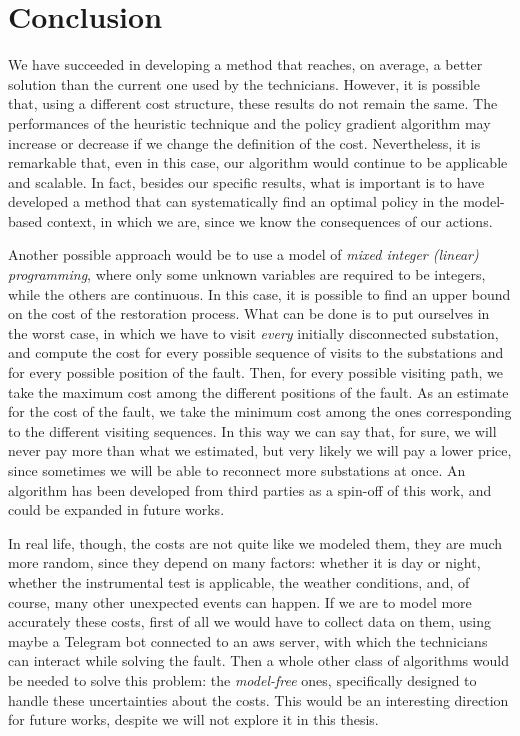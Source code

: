 \chapter{Conclusion}


We have succeeded in developing a method that reaches, on average, a better solution than the current one used by the technicians. However, it is possible that, using a different cost structure, these results do not remain the same. The performances of the heuristic technique and the policy gradient algorithm may increase or decrease if we change the definition of the cost. Nevertheless, it is remarkable that, even in this case, our algorithm would continue to be applicable and scalable. In fact, besides our specific results, what is important is to have developed a method that can systematically find an optimal policy in the model-based context, in which we are, since we know the consequences of our actions.

Another possible approach would be to use a model of \emph{mixed integer (linear) programming}, where only some unknown variables are required to be integers, while the others are continuous. In this case, it is possible to find an upper bound on the cost of the restoration process. What can be done is to put ourselves in the worst case, in which we have to visit \emph{every} initially disconnected substation, and compute the cost for every possible sequence of visits to the substations and for every possible position of the fault. Then, for every possible visiting path, we take the maximum cost among the different positions of the fault. As an estimate for the cost of the fault, we take the minimum cost among the ones corresponding to the different visiting sequences. In this way we can say that, for sure, we will never pay more than what we estimated, but very likely we will pay a lower price, since sometimes we will be able to reconnect more substations at once. An algorithm has been developed from third parties as a spin-off of this work, and could be expanded in future works.

In real life, though, the costs are not quite like we modeled them, they are much more random, since they depend on many factors: whether it is day or night, whether the instrumental test is applicable, the weather conditions, and, of course, many other unexpected events can happen. If we are to model more accurately these costs, first of all we would have to collect data on them, using maybe a Telegram bot connected to an \acrshort{aws} server, with which the technicians can interact while solving the fault. Then a whole other class of algorithms would be needed to solve this problem: the \emph{model-free} ones, specifically designed to handle these uncertainties about the costs. This would be an interesting direction for future works, despite we will not explore it in this thesis.